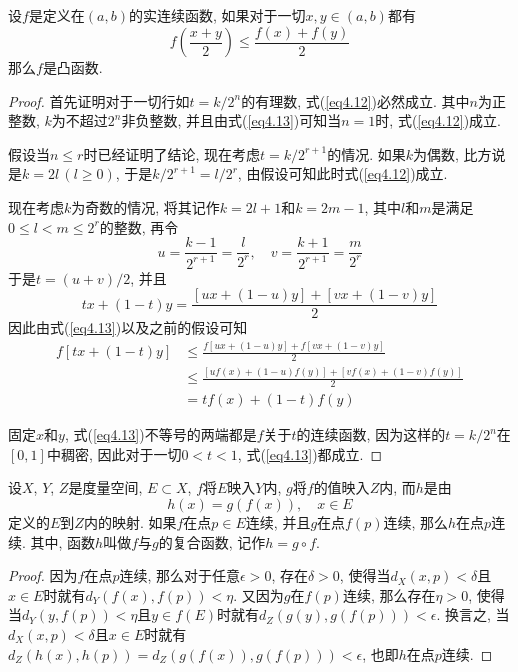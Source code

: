 \documentclass[cn,12pt,math=mtpro2,citestyle=gb7714-2015,bibstyle=gb7714-2015,twocol]{elegantbook}
\begin{document}
\begin{example}
设$f$是定义在$(a,b)$的实连续函数, 如果对于一切$x,y\in(a,b)$都有
\begin{equation}\label{eq4.13}
  f\left(\frac{x+y}{2}\right)\leq\frac{f(x)+f(y)}{2}
\end{equation}
那么$f$是凸函数.
\end{example}
\begin{proof}
  首先证明对于一切行如$t=k/2^n$的有理数, 式(\ref{eq4.12})必然成立. 其中$n$为正整数, $k$为不超过$2^n$非负整数, 并且由式(\ref{eq4.13})可知当$n=1$时, 式(\ref{eq4.12})成立.

  假设当$n\leq r$时已经证明了结论, 现在考虑$t=k/2^{r+1}$的情况. 如果$k$为偶数, 比方说是$k=2l\,(l\geq 0)$, 于是$k/2^{r+1}=l/2^r$, 由假设可知此时式(\ref{eq4.12})成立.

  现在考虑$k$为奇数的情况, 将其记作$k=2l+1$和$k=2m-1$, 其中$l$和$m$是满足$0\leq l<m\leq 2^r$的整数, 再令
  $$u=\frac{k-1}{2^{r+1}}=\frac{l}{2^r}, \quad v=\frac{k+1}{2^{r+1}}=\frac{m}{2^r}$$
  于是$t=(u+v)/2$, 并且
  $$tx+(1-t)y=\frac{[ux+(1-u)y]+[vx+(1-v)y]}{2}$$
  因此由式(\ref{eq4.13})以及之前的假设可知
  \begin{align*}
  f[tx+(1-t)y]&\leq\frac{f[ux+(1-u)y]+f[vx+(1-v)y]}{2} \\
  &\leq \frac{[uf(x)+(1-u)f(y)]+[vf(x)+(1-v)f(y)]}{2}\\
  &=tf(x)+(1-t)f(y)
  \end{align*}

  固定$x$和$y$, 式(\ref{eq4.13})不等号的两端都是$f$关于$t$的连续函数, 因为这样的$t=k/2^n$在$[0,1]$中稠密, 因此对于一切$0<t<1$, 式(\ref{eq4.13})都成立.
\end{proof}
\begin{theorem}
  设$X$, $Y$, $Z$是度量空间, $E\subset X$, $f$将$E$映入$Y$内, $g$将$f$的值映入$Z$内, 而$h$是由
  $$h(x)=g(f(x)),\quad x\in E$$
  定义的$E$到$Z$内的映射. 如果$f$在点$p\in E$连续, 并且$g$在点$f(p)$连续, 那么$h$在点$p$连续. 其中, 函数$h$叫做$f$与$g$的复合函数, 记作$h=g\circ f$.
\end{theorem}
\begin{proof}
  因为$f$在点$p$连续, 那么对于任意$\epsilon>0$, 存在$\delta>0$, 使得当$d_X(x,p)<\delta$且$x\in E$时就有$d_Y(f(x),f(p))<\eta$. 又因为$g$在$f(p)$连续,  那么存在$\eta>0$, 使得当$d_Y(y,f(p))<\eta$且$y\in f(E)$时就有$d_Z(g(y),g(f(p)))<\epsilon$. 换言之, 当$d_X(x,p)<\delta$且$x\in E$时就有$d_Z(h(x),h(p))=d_Z(g(f(x)),g(f(p)))<\epsilon$, 也即$h$在点$p$连续.

\end{proof}
\end{document}
